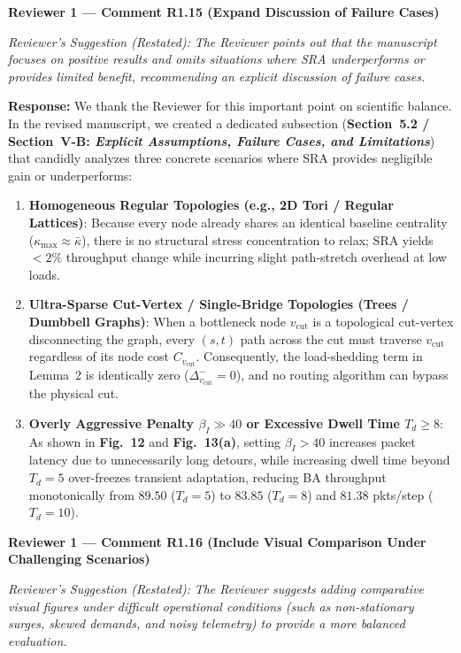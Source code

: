 \documentclass[11pt,a4paper]{article}
\newcommand{\cbox}[2]{%
  \vspace{0.6em}\noindent\textbf{#1}\par\smallskip
  \noindent\textit{Reviewer's Suggestion (Restated):} \textit{#2}\par\smallskip
}
\begin{document}
\hrulefill

\cbox{Reviewer 1 --- Comment R1.15 (Expand Discussion of Failure Cases)}{The Reviewer points out that the manuscript focuses on positive results and omits situations where SRA underperforms or provides limited benefit, recommending an explicit discussion of failure cases.}

\noindent\textbf{Response:} We thank the Reviewer for this important point on scientific balance. In the revised manuscript, we created a dedicated subsection (\textbf{Section~5.2 / Section~V-B: \textit{Explicit Assumptions, Failure Cases, and Limitations}}) that candidly analyzes three concrete scenarios where SRA provides negligible gain or underperforms:
\begin{enumerate}[leftmargin=1.8em]
    \item \textbf{Homogeneous Regular Topologies (e.g., 2D Tori / Regular Lattices)}: Because every node already shares an identical baseline centrality ($\kappa_{\max} \approx \bar{\kappa}$), there is no structural stress concentration to relax; SRA yields $<2\%$ throughput change while incurring slight path-stretch overhead at low loads.
    \item \textbf{Ultra-Sparse Cut-Vertex / Single-Bridge Topologies (Trees / Dumbbell Graphs)}: When a bottleneck node $v_{\text{cut}}$ is a topological cut-vertex disconnecting the graph, every $(s,t)$ path across the cut must traverse $v_{\text{cut}}$ regardless of its node cost $C_{v_{\text{cut}}}$. Consequently, the load-shedding term in Lemma~2 is identically zero ($\Delta_{v_{\text{cut}}}^- = 0$), and no routing algorithm can bypass the physical cut.
    \item \textbf{Overly Aggressive Penalty $\beta_I \gg 40$ or Excessive Dwell Time $T_d \ge 8$}: As shown in \textbf{Fig.~12} and \textbf{Fig.~13(a)}, setting $\beta_I > 40$ increases packet latency due to unnecessarily long detours, while increasing dwell time beyond $T_d=5$ over-freezes transient adaptation, reducing BA throughput monotonically from $89.50$ ($T_d=5$) to $83.85$ ($T_d=8$) and $81.38$ pkts/step ($T_d=10$).
\end{enumerate}

\hrulefill

\cbox{Reviewer 1 --- Comment R1.16 (Include Visual Comparison Under Challenging Scenarios)}{The Reviewer suggests adding comparative visual figures under difficult operational conditions (such as non-stationary surges, skewed demands, and noisy telemetry) to provide a more balanced evaluation.}
\end{document}
